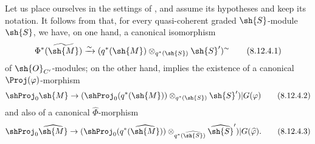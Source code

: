 \begin{env}[8.12.4]
\label{II.8.12.4}
Let us place ourselves in the settings of , and assume its hypotheses and keep its notation.
It follows from  that, for every quasi-coherent graded $\sh{S}$-module $\sh{S}$, we have, on one hand, a canonical isomorphism
\[
\label{II.8.12.4.1}
    \Phi^*(\widetilde{\sh{M}}) \xrightarrow{\sim} (q^*(\sh{M})\otimes_{q^*(\sh{S})}\sh{S}')^\sim
\tag{8.12.4.1}
\]
of $\sh{O}_{C'}$-modules;
on the other hand,  implies the existence of a canonical $\Proj(\varphi)$-morphism
\[
\label{II.8.12.4.2}
    \shProj_0\sh{M} \to (\shProj_0(q^*(\sh{M}))\otimes_{q^*(\sh{S})}\sh{S}')|G(\varphi)
\tag{8.12.4.2}
\]
and also of a canonical $\widehat{\Phi}$-morphism
\[
\label{II.8.12.4.3}
    \shProj_0\widehat{\sh{M}} \to (\shProj_0(q^*(\widehat{\sh{M}}))\otimes_{q^*(\widehat{\sh{S}})}\widehat{\sh{S}}')|G(\widehat{\varphi}).
\tag{8.12.4.3}
\]
\end{env}

